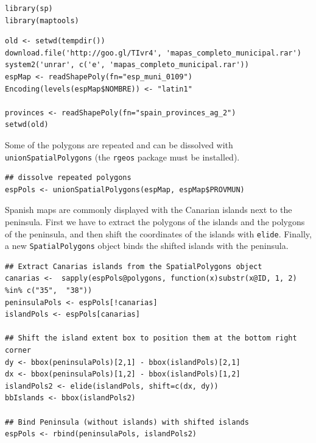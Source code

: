 \lstset{language=R,numbers=none}
\begin{lstlisting}
library(sp)
library(maptools)
\end{lstlisting}


\lstset{language=R,numbers=none}
\begin{lstlisting}
old <- setwd(tempdir())
download.file('http://goo.gl/TIvr4', 'mapas_completo_municipal.rar')
system2('unrar', c('e', 'mapas_completo_municipal.rar'))
espMap <- readShapePoly(fn="esp_muni_0109")
Encoding(levels(espMap$NOMBRE)) <- "latin1"

provinces <- readShapePoly(fn="spain_provinces_ag_2")
setwd(old)
\end{lstlisting}

Some of the polygons are repeated and can be dissolved with
\texttt{unionSpatialPolygons} (the \texttt{rgeos} package must be installed).
\lstset{language=R,numbers=none}
\begin{lstlisting}
## dissolve repeated polygons
espPols <- unionSpatialPolygons(espMap, espMap$PROVMUN)
\end{lstlisting}

Spanish maps are commonly displayed with the Canarian islands next
to the peninsula. First we have to extract the polygons of the
islands and the polygons of the peninsula, and then shift the
coordinates of the islands with \texttt{elide}. Finally, a new
\texttt{SpatialPolygons} object binds the shifted islands with the
peninsula.

\lstset{language=R,numbers=none}
\begin{lstlisting}
## Extract Canarias islands from the SpatialPolygons object
canarias <-  sapply(espPols@polygons, function(x)substr(x@ID, 1, 2) %in% c("35",  "38"))
peninsulaPols <- espPols[!canarias]
islandPols <- espPols[canarias]

## Shift the island extent box to position them at the bottom right corner
dy <- bbox(peninsulaPols)[2,1] - bbox(islandPols)[2,1]
dx <- bbox(peninsulaPols)[1,2] - bbox(islandPols)[1,2]
islandPols2 <- elide(islandPols, shift=c(dx, dy))
bbIslands <- bbox(islandPols2)

## Bind Peninsula (without islands) with shifted islands
espPols <- rbind(peninsulaPols, islandPols2)
\end{lstlisting}

